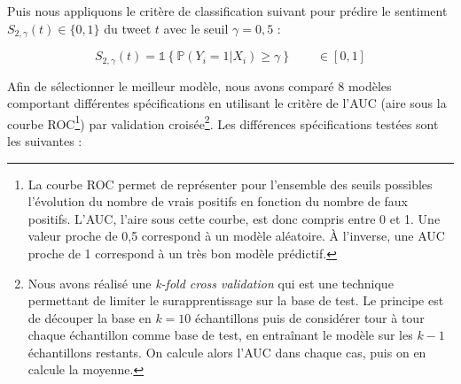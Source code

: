 \documentclass[11pt,french,french]{article}
\let\rmarkdownfootnote\footnote%
\def\footnote{\protect\rmarkdownfootnote}
\begin{document}
Puis nous appliquons le critère de classification suivant pour prédire le sentiment \(S_{2,\gamma}(t) \in \{0,1\}\) du tweet \(t\) avec le seuil \(\gamma = 0,5\) :

\[S_{2,\gamma}(t) = \mathds{1}\left\{   \mathbb{P}(Y_i = 1 | X_{i}) \ge \gamma\right\} \qquad \in [0,1]\]

Afin de sélectionner le meilleur modèle, nous avons comparé 8 modèles comportant différentes spécifications en utilisant le critère de l'AUC (aire sous la courbe ROC\footnote{La courbe ROC permet de représenter pour l'ensemble des seuils possibles l'évolution du nombre de vrais positifs en fonction du nombre de faux positifs.
  L'AUC, l'aire sous cette courbe, est donc compris entre 0 et 1. Une valeur proche de 0,5 correspond à un modèle aléatoire. À l'inverse, une AUC proche de 1 correspond à un très bon modèle prédictif.}) par validation croisée\footnote{Nous avons réalisé une \emph{k-fold cross validation} qui est une technique permettant de limiter le surapprentissage sur la base de test.
  Le principe est de découper la base en \(k = 10\) échantillons puis de considérer tour à tour chaque échantillon comme base de test, en entraînant le modèle sur les \(k-1\) échantillons restants.
  On calcule alors l'AUC dans chaque cas, puis on en calcule la moyenne.}.
Les différences spécifications testées sont les suivantes :
\end{document}
